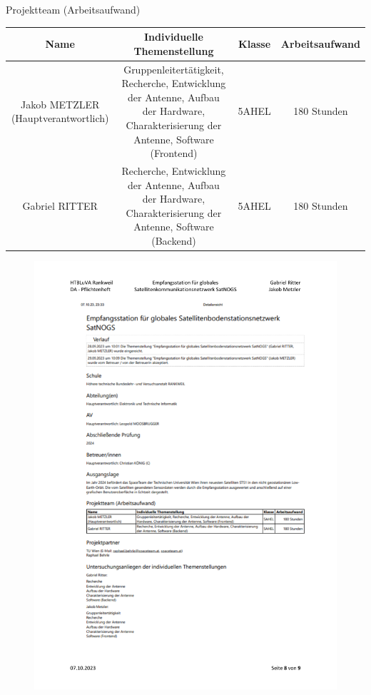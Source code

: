 {\large Projektteam (Arbeitsaufwand)}

\begin{tabular}{|c|c|c|c|}
	\hline
	\textbf{Name} & \textbf{Individuelle Themenstellung} & \textbf{Klasse} & \textbf{Arbeitsaufwand} \\
	\hline
	\parbox{4cm}{Jakob METZLER (Hauptverantwortlich)} & \parbox{5cm}{ Gruppenleitertätigkeit, Recherche, Entwicklung der Antenne, Aufbau der Hardware, Charakterisierung der Antenne, Software (Frontend)} & 5AHEL & 180 Stunden\\
	\hline
	Gabriel RITTER & \parbox{5cm}{Recherche, Entwicklung der Antenne, Aufbau der Hardware, Charakterisierung der Antenne, Software (Backend)} & 5AHEL & 180 Stunden\\
	\hline
\end{tabular}

\begin{figure}
	\centering
	\includegraphics[width=\textwidth]{../ref/DA_Metzler_Ritter_Pflichtenheft_v1.2-page8.pdf}
\end{figure}


